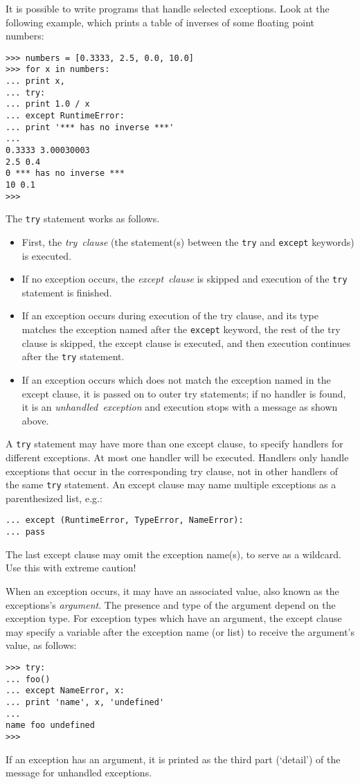 It is possible to write programs that handle selected exceptions.
Look at the following example, which prints a table of inverses of
some floating point numbers:
\bcode\begin{verbatim}
>>> numbers = [0.3333, 2.5, 0.0, 10.0]
>>> for x in numbers:
... print x,
... try:
... print 1.0 / x
... except RuntimeError:
... print '*** has no inverse ***'
...
0.3333 3.00030003
2.5 0.4
0 *** has no inverse ***
10 0.1
>>>
\end{verbatim}\ecode
The {\tt try} statement works as follows.
\begin{itemize}
\item
First, the
{\em try\ clause}
(the statement(s) between the {\tt try} and {\tt except} keywords) is
executed.
\item
If no exception occurs, the
{\em except\ clause}
is skipped and execution of the {\tt try} statement is finished.
\item
If an exception occurs during execution of the try clause, and its
type matches the exception named after the {\tt except} keyword, the
rest of the try clause is skipped, the except clause is executed, and
then execution continues after the {\tt try} statement.
\item
If an exception occurs which does not match the exception named in the
except clause, it is passed on to outer try statements; if no handler is
found, it is an
{\em unhandled\ exception}
and execution stops with a message as shown above.
\end{itemize}
A {\tt try} statement may have more than one except clause, to specify
handlers for different exceptions.
At most one handler will be executed.
Handlers only handle exceptions that occur in the corresponding try
clause, not in other handlers of the same {\tt try} statement.
An except clause may name multiple exceptions as a parenthesized list,
e.g.:
\bcode\begin{verbatim}
... except (RuntimeError, TypeError, NameError):
... pass
\end{verbatim}\ecode
The last except clause may omit the exception name(s), to serve as a
wildcard.
Use this with extreme caution!

When an exception occurs, it may have an associated value, also known as
the exceptions's
{\em argument}.
The presence and type of the argument depend on the exception type.
For exception types which have an argument, the except clause may
specify a variable after the exception name (or list) to receive the
argument's value, as follows:
\bcode\begin{verbatim}
>>> try:
... foo()
... except NameError, x:
... print 'name', x, 'undefined'
...
name foo undefined
>>>
\end{verbatim}\ecode
If an exception has an argument, it is printed as the third part
(`detail') of the message for unhandled exceptions.

